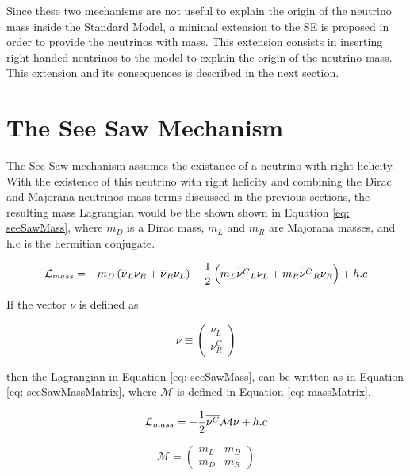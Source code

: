 Since these two mechanisms are not useful to explain the origin of the neutrino mass inside the Standard Model, a minimal extension to the SE is proposed in order to provide the neutrinos with mass. This extension consists in inserting right handed neutrinos to the model to explain the origin of the neutrino mass. This extension and its consequences is described in the next section.

\section{The See Saw Mechanism} 

The See-Saw mechanism assumes the existance of a neutrino with right helicity. With the existence of this neutrino with right helicity and combining the Dirac and Majorana neutrinos mass terms discussed in the previous sections, the resulting mass Lagrangian would be the shown shown in Equation \ref{eq: seeSawMass}, where $m_{D}$ is a Dirac mass, $m_{L}$ and $m_{R}$ are Majorana masses, and h.c is the hermitian conjugate.

\begin{equation}\label{eq: seeSawMass}
\mathcal{L}_{mass} = -m_{D}\left(\overline{\nu}_{L}\nu_{R} + \overline{\nu}_{R}\nu_{L}\right) - \frac{1}{2}\left(m_{L}\overline{\nu^{C}}_{L}\nu_{L} + m_{R}\overline{\nu^{C}}_{R}\nu_{R}\right) + h.c
\end{equation}

If the vector $\nu$ is defined as

$$ \nu \equiv \begin{pmatrix} \nu_{L}\\ \nu^{C}_{R} \end{pmatrix}$$

then the Lagrangian in Equation \ref{eq: seeSawMass}, can be written as in Equation \ref{eq: seeSawMassMatrix}, where $\mathcal{M}$ is defined in Equation \ref{eq: massMatrix}.

\begin{equation}\label{eq: seeSawMassMatrix}
\mathcal{L}_{mass} = -\frac{1}{2}\overline{\nu^{C}}\mathcal{M}\nu + h.c
\end{equation}

\begin{equation}\label{eq: massMatrix}
\mathcal{M} = \begin{pmatrix} m_{L}&m_{D}\\m_{D}&m_{R} \end{pmatrix}
\end{equation}








 



